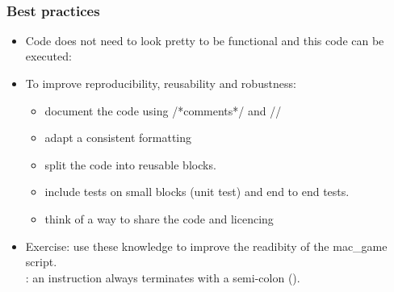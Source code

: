 \begin{frame}
  \begin{example}[Loops]~\par
    
  \end{example}
\end{frame}

\begin{frame}[fragile]
	\frametitle<presentation>{Best practices}
	\begin{itemize}
		\item<1-> Code does not need to look pretty to be
		functional and this code can be executed:\par
		
		\item<2-> To improve reproducibility, reusability and robustness:
		\begin{itemize}
			\item document the code using  \textcolor{green!50!black}{/*comments*/} and  \textcolor{green!50!black}{//}
			\item adapt a consistent formatting
			\item split the code into reusable blocks.
			\item include tests on small blocks (unit test) and end to end tests.
			\item think of a way to share the code and licencing
		\end{itemize}
		\item<3-> Exercise: use these knowledge to improve the readibity of the mac\_game script. \\ : an instruction always terminates with a semi-colon (\kw{!}).
	\end{itemize}
\end{frame}

